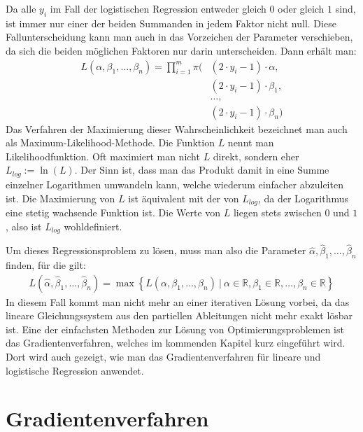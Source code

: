 Da alle $y_i$ im Fall der logistischen Regression entweder gleich $0$ oder gleich $1$ sind, ist immer nur einer der beiden Summanden in jedem Faktor nicht null. Diese Fallunterscheidung kann man auch in das Vorzeichen der Parameter verschieben, da sich die beiden möglichen Faktoren nur darin unterscheiden. Dann erhält man:
\begin{align*}
    L(\alpha, \beta_1, \dots, \beta_n) = \prod_{i=1}^m \pi(&(2 \cdot y_i - 1) \cdot \alpha, \\
    &(2 \cdot y_i - 1) \cdot \beta_1, \\
    &\dots, \\
    &(2 \cdot y_i - 1) \cdot \beta_n)
\end{align*}
Das Verfahren der Maximierung dieser Wahrscheinlichkeit bezeichnet man auch als Maximum-Likelihood-Methode. Die Funktion $L$ nennt man Likelihoodfunktion. Oft maximiert man nicht $L$ direkt, sondern eher $L_{log} := \ln(L)$. Der Sinn ist, dass man das Produkt damit in eine Summe einzelner Logarithmen umwandeln kann, welche wiederum einfacher abzuleiten ist. Die Maximierung von $L$ ist äquivalent mit der von $L_{log}$, da der Logarithmus eine stetig wachsende Funktion ist. Die Werte von $L$ liegen stets zwischen $0$ und $1$, also ist $L_{log}$ wohldefiniert.

Um dieses Regressionsproblem zu lösen, muss man also die Parameter $\hat\alpha, \hat\beta_1, \dots, \hat\beta_n$ finden, für die gilt:
\begin{align*}
    L(\hat\alpha, \hat\beta_1, \dots, \hat\beta_n) = \max \left\{ L(\alpha, \beta_1, \dots, \beta_n) ~|~ \alpha \in \mathbb{R}, \beta_1 \in \mathbb{R}, \dots, \beta_n \in \mathbb{R} \right\}
\end{align*}
In diesem Fall kommt man nicht mehr an einer iterativen Lösung vorbei, da das lineare Gleichungssystem aus den partiellen Ableitungen nicht mehr exakt lösbar ist. Eine der einfachsten Methoden zur Lösung von Optimierungsproblemen ist das Gradientenverfahren, welches im kommenden Kapitel kurz eingeführt wird. Dort wird auch gezeigt, wie man das Gradientenverfahren für lineare und logistische Regression anwendet.

\section{Gradientenverfahren}
\label{section:2:3}

